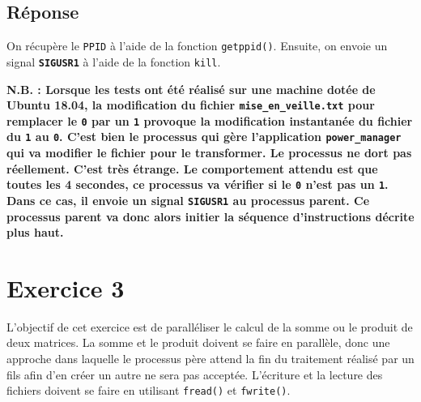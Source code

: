 \documentclass[
	12pt, %
]{fphw}
\begin{document}
\subsection*{Réponse}
On récupère le \texttt{PPID} à l'aide de la fonction \texttt{getppid()}. Ensuite, on envoie un signal \texttt{\textbf{SIGUSR1}} à l'aide de la fonction \texttt{kill}.


\textbf{N.B. : Lorsque les tests ont été réalisé sur une machine dotée de Ubuntu 18.04, la modification du fichier \texttt{mise\_en\_veille.txt} pour remplacer le \texttt{0} par un \texttt{1} provoque la modification instantanée du fichier du \texttt{1} au \texttt{0}. C'est bien le processus qui gère l'application \texttt{power\_manager} qui va modifier le fichier pour le transformer. Le processus ne dort pas réellement. C'est très étrange. Le comportement attendu est que toutes les 4 secondes, ce processus va vérifier si le \texttt{0} n'est pas un \texttt{1}. Dans ce cas, il envoie un signal \texttt{\textbf{SIGUSR1}} au processus parent. Ce processus parent va donc alors initier la séquence d'instructions décrite plus haut.}

\section*{Exercice 3}
L'objectif de cet exercice est de paralléliser le calcul de la somme ou le produit de deux matrices.
La somme et le produit doivent se faire en parallèle, donc une approche dans laquelle le processus père attend la fin du traitement réalisé par un fils afin d'en créer un autre ne sera pas acceptée.
L'écriture et la lecture des fichiers doivent se faire en utilisant \texttt{fread()} et \texttt{fwrite()}.
\end{document}
